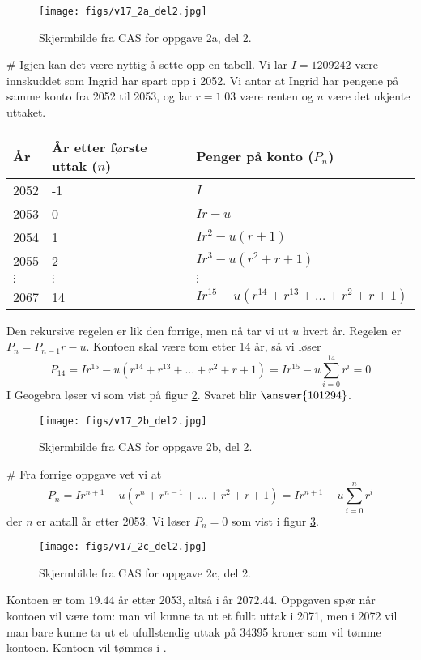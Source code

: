 \begin{easylist}[enumerate]
	\begin{figure}[th!]
		\centering
		\texttt{[image: figs/v17\_2a\_del2.jpg]}
		\caption{Skjermbilde fra CAS for oppgave 2a, del 2.}
		\label{fig:cas1}
	\end{figure}
	# Igjen kan det være nyttig å sette opp en tabell.
	Vi lar $I = 1209242$ være innskuddet som Ingrid har spart opp i 2052. Vi antar at Ingrid har pengene på samme konto fra 2052 til 2053, og lar $r = 1.03$ være renten og $u$ være det ukjente uttaket.
		\begin{center}
		\begin{tabular}{lll}
			\textbf{År} & \textbf{År etter første uttak} ($n$) & \textbf{Penger på konto} ($P_n$) \\ \hline
			2052 & -1 & $I$ \\
			2053 & 0 & $Ir - u$ \\
			2054 & 1 & $Ir^2 - u(r+1)$ \\
			2055 & 2 & $Ir^3 - u(r^2 + r+1)$ \\
			$\vdots$ & $\vdots$ & $\vdots$ \\
			2067 & 14 & $Ir^{15} - u (r^{14} + r^{13} + \dots + r^2 + r + 1)$
		\end{tabular}
	\end{center}
	Den rekursive regelen er lik den forrige, men nå tar vi ut $u$ hvert år. Regelen er $P_n = P_{n-1}r - u$. Kontoen skal være tom etter 14 år, så vi løser
	\begin{equation*}
		P_{14} = Ir^{15} - u (r^{14} + r^{13} + \dots + r^2 + r + 1) = Ir^{15} - u \sum_{i = 0}^{14} r^i = 0
	\end{equation*}
	I Geogebra løser vi som vist på figur \ref{fig:cas2}. Svaret blir $\answer{101294}$.
	\begin{figure}[th!]
		\centering
		\texttt{[image: figs/v17\_2b\_del2.jpg]}
		\caption{Skjermbilde fra CAS for oppgave 2b, del 2.}
		\label{fig:cas2}
	\end{figure}
	

	# Fra forrige oppgave vet vi at
	\begin{equation*}
		P_{n} = Ir^{n+1} - u (r^{n} + r^{n-1} + \dots + r^2 + r + 1) = Ir^{n+1} - u \sum_{i = 0}^{n} r^i
	\end{equation*}
	der $n$ er antall år etter 2053.
	Vi løser $P_n = 0$ som vist i figur \ref{fig:cas3}.
	\begin{figure}[th!]
		\centering
		\texttt{[image: figs/v17\_2c\_del2.jpg]}
		\caption{Skjermbilde fra CAS for oppgave 2c, del 2.}
		\label{fig:cas3}
	\end{figure}
	Kontoen er tom $19.44$ år etter 2053, altså i år $2072.44$.
	Oppgaven spør når kontoen vil være tom:
	man vil kunne ta ut et fullt uttak i 2071, men i 2072 vil man bare kunne ta 
	ut et ufullstendig uttak på 34395 kroner som vil tømme kontoen. Kontoen vil 
	tømmes i .
\end{easylist}


